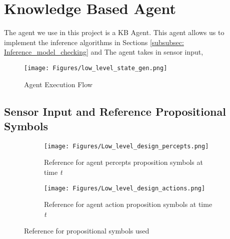 \section{Knowledge Based Agent}

The agent we use in this project is a KB Agent. This agent allows us to implement the inference algorithms in Sections \ref{subsubsec: Inference_model_checking} and   The agent takes in sensor input,

\begin{figure}[H]
    \centering
    \texttt{[image: Figures/low\_level\_state\_gen.png]}
    \caption{Agent Execution Flow} 
    \label{fig:agent_in_env_low_level}
\end{figure}



\subsection{Sensor Input and Reference Propositional Symbols}



\begin{figure}[H]
\captionsetup[subfigure]{justification=centering}
\centering
\begin{subfigure}{.5\textwidth}
    \centering
    \texttt{[image: Figures/Low\_level\_design\_percepts.png]}
    \caption{Reference for agent percepts proposition symbols \newline at time \textit{t}} 
    \label{fig:agent_in_env_low_level_percepts}
\end{subfigure}%
\begin{subfigure}{.5\textwidth}
    \centering
    \texttt{[image: Figures/Low\_level\_design\_actions.png]}
    \caption{Reference for agent action proposition symbols at time \textit{t}} 
    \label{fig:agent_in_env_low_level_action}
\end{subfigure}
\caption{Reference for propositional symbols used}
\label{fig:test}
\end{figure}


